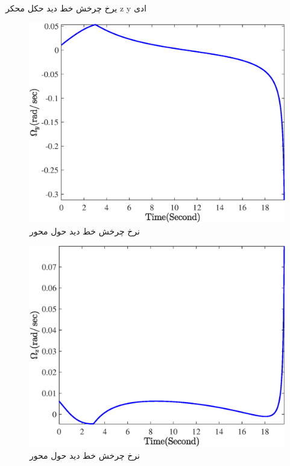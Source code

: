 یرخ چرخش خط دید حکل محکر z y ادی

\begin{figure}[H]
	\centering
	\includegraphics[width=.75\linewidth]{../Figure/Q1/a/Omega_y}
	\caption{نرخ چرخش خط دید حول محور }
\end{figure}

\begin{figure}[H]
	\centering
	\includegraphics[width=.75\linewidth]{../Figure/Q1/a/Omega_z}
	\caption{نرخ چرخش خط دید حول محور }
\end{figure}
